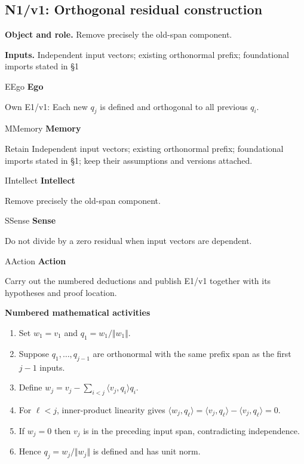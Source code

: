 \documentclass[preprint,12pt,aps,pra,showkeys,amsmath,amssymb,superscriptaddress,floatfix]{revtex4-2}
\theoremstyle{definition}
\theoremstyle{remark}
\newcommand{\mmfaculty}[3]{%
 \begin{mmfacultybox}{#1}{#2}
 {\sffamily\bfseries\color{MMBlue}#2}\par\smallskip #3
 \end{mmfacultybox}}
\newcommand{\field}[2]{\par\smallskip\noindent\textbf{#1.} #2\par}
\begin{document}
\subsection{N1/v1: Orthogonal residual construction}

\field{Object and role}{Remove precisely the old-span component.}

\field{Inputs}{Independent input vectors; existing orthonormal prefix; foundational
imports stated in §1}

\mmfaculty{E}{Ego}{Own E1/v1: Each new \(q_j\) is defined and orthogonal to all previous
\(q_i\).}

\mmfaculty{M}{Memory}{Retain Independent input vectors; existing orthonormal prefix;
foundational imports stated in §1; keep their assumptions and versions
attached.}

\mmfaculty{I}{Intellect}{Remove precisely the old-span component.}

\mmfaculty{S}{Sense}{Do not divide by a zero residual when input vectors are dependent.}

\mmfaculty{A}{Action}{Carry out the numbered deductions and publish E1/v1 together with its
hypotheses and proof location.}

\smallskip\noindent\textbf{Numbered mathematical activities}

\begin{enumerate}[label=N1.\arabic*,leftmargin=3.4em]

\item Set \(w_{1}=v_{1}\) and \(q_{1}=w_{1}/\Vert w_{1}\Vert\).

\item Suppose \(q_{1},\ldots ,q_{j-1}\) are orthonormal with the same prefix
span as the first \(j-1\) inputs.

\item Define \(w_j=v_j-\sum _{i<j}\langle v_j,q_i\rangle q_i\).

\item For \(\ell <j\), inner-product linearity gives
\(\langle w_j,q_\ell \rangle =\langle v_j,q_\ell \rangle -\langle v_j,q_\ell \rangle =0\).

\item If \(w_j=0\) then \(v_j\) is in the preceding input span, contradicting
independence.

\item Hence \(q_j=w_j/\Vert w_j\Vert\) is defined and has unit norm.

\end{enumerate}
\end{document}
